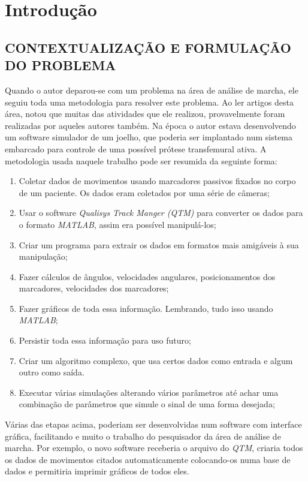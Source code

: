 \chapter[INTRODUÇÃO]{\textbf {Introdução}}
\section{CONTEXTUALIZAÇÃO E FORMULAÇÃO DO PROBLEMA}
Quando o autor deparou-se com um problema na área de análise de marcha, 
ele seguiu toda uma metodologia para resolver este problema. 
Ao ler artigos desta área, notou que muitas das atividades que ele realizou, provavelmente foram realizadas por aqueles autores também. 
Na época o autor estava desenvolvendo um software simulador de um joelho, que poderia ser implantado num sistema embarcado para controle de uma possível prótese transfemural ativa.
A metodologia usada naquele trabalho pode ser resumida da seguinte forma:
\begin{enumerate}
	\item Coletar dados de movimentos usando marcadores passivos fixados no corpo de um paciente. Os dados eram coletados por uma série de câmeras;
	\item Usar o software \emph{Qualisys Track Manger (QTM)} \cite{Qualisys2010} para converter os dados para o formato \emph{MATLAB}, assim era possível manipulá-los;
	\item Criar um programa para extrair os dados em formatos mais amigáveis à sua manipulação;
	\item Fazer cálculos de ângulos, velocidades angulares, posicionamentos dos marcadores, velocidades dos marcadores;
	\item Fazer gráficos de toda essa informação. Lembrando, tudo isso usando \emph{MATLAB};
	\item Persistir toda essa informação para uso futuro;
	\item Criar um algoritmo complexo, que usa certos dados como entrada e algum outro como saída.
	\item Executar várias simulações alterando vários parâmetros até achar uma combinação de parâmetros que simule o sinal de uma forma desejada;
\end{enumerate}

Várias das etapas acima, poderiam ser desenvolvidas num software com interface gráfica, facilitando e muito o trabalho do pesquisador da área de análise de marcha. Por exemplo, o novo software receberia o arquivo do \emph{QTM}, criaria todos os dados de movimentos citados automaticamente colocando-os numa base de dados e permitiria imprimir gráficos de todos eles.

